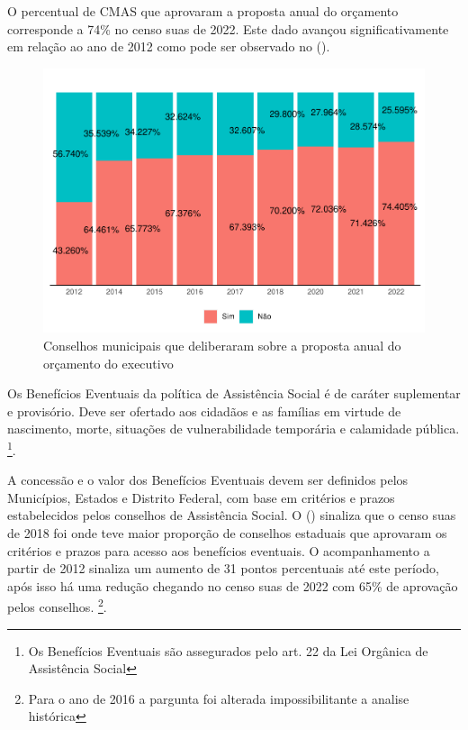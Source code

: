\documentclass[
  brazilian]{report}
\begin{document}
O percentual de CMAS que aprovaram a proposta anual do orçamento
corresponde a 74\% no censo suas de 2022. Este dado avançou
significativamente em relação ao ano de 2012 como pode ser observado no
().

\begin{figure}
\includegraphics{Censo-SUAS-2022_files/figure-latex/cmas_ppa-1} \caption[Conselhos municipais que deliberaram sobre a proposta anual do orçamento do executivo]{Conselhos municipais que deliberaram sobre a proposta anual do orçamento do executivo}\label{fig:cmas_ppa}
\end{figure}

Os Benefícios Eventuais da política de Assistência Social é de caráter
suplementar e provisório. Deve ser ofertado aos cidadãos e as famílias
em virtude de nascimento, morte, situações de vulnerabilidade temporária
e calamidade pública.
\footnote{Os Benefícios Eventuais são assegurados pelo art. 22 da Lei Orgânica de Assistência Social}.

A concessão e o valor dos Benefícios Eventuais devem ser definidos pelos
Municípios, Estados e Distrito Federal, com base em critérios e prazos
estabelecidos pelos conselhos de Assistência Social. O
() sinaliza que o censo suas de 2018 foi onde teve
maior proporção de conselhos estaduais que aprovaram os critérios e
prazos para acesso aos benefícios eventuais. O acompanhamento a partir
de 2012 sinaliza um aumento de 31 pontos percentuais até este período,
após isso há uma redução chegando no censo suas de 2022 com 65\% de
aprovação pelos conselhos.
\footnote{Para o ano de 2016 a pargunta foi alterada impossibilitante a analise histórica}.
\end{document}
